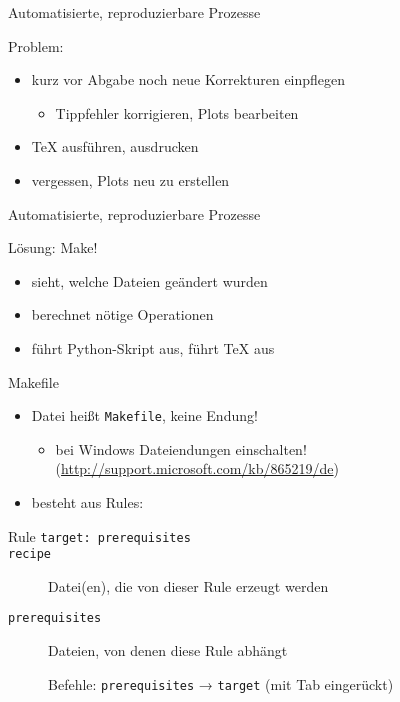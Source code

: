 \begin{frame}{Automatisierte, reproduzierbare Prozesse}

  {\huge Problem:}
  \vspace{1em}
  \begin{itemize}
    \item kurz vor Abgabe noch neue Korrekturen einpflegen
      \begin{itemize}
        \item Tippfehler korrigieren, Plots bearbeiten
      \end{itemize}
    \item \TeX{} ausführen, ausdrucken
    \item vergessen, Plots neu zu erstellen
  \end{itemize}
\end{frame}

\begin{frame}{Automatisierte, reproduzierbare Prozesse}

  {\huge Lösung: Make!}
  \vspace{1em}
  \begin{itemize}
    \item sieht, welche Dateien geändert wurden
    \item berechnet nötige Operationen
    \item führt Python-Skript aus, führt \TeX{} aus
  \end{itemize}
\end{frame}

\begin{frame}{Makefile}
  \begin{itemize}
    \item Datei heißt \texttt{Makefile}, keine Endung!
      \begin{itemize}
        \item bei Windows Dateiendungen einschalten! (\url{http://support.microsoft.com/kb/865219/de})
      \end{itemize}
    \item besteht aus Rules:
  \end{itemize}
  \begin{block}{Rule}
    \texttt{target: prerequisites\\
    \hspace{1cm} recipe}
  \end{block}
  \begin{description}
    \item[\texttt{\hphantom{prerequisites}}] Datei(en), die von dieser Rule erzeugt werden
    \item[\texttt{prerequisites}]                         Dateien, von denen diese Rule abhängt
    \item[\texttt{\hphantom{prerequisites}}] Befehle: \texttt{prerequisites} → \texttt{target} (mit Tab eingerückt)
  \end{description}
\end{frame}

